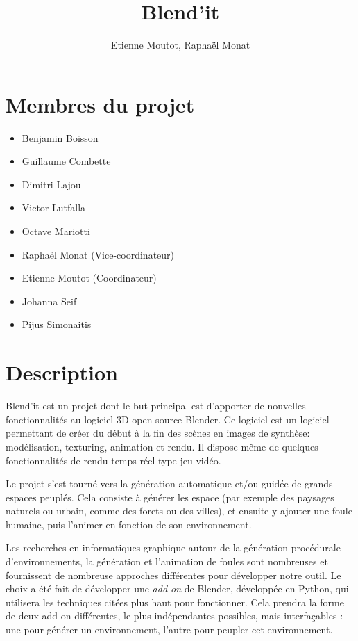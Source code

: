 \documentclass[a4paper,12pt]{article}
\title{Blend'it}
\author{Etienne Moutot, Raphaël Monat}
\begin{document}
\maketitle

\section{Membres du projet}
  \begin{itemize}
    \item Benjamin Boisson
    \item Guillaume Combette
    \item Dimitri Lajou
    \item Victor Lutfalla
    \item Octave Mariotti
    \item Raphaël Monat (Vice-coordinateur)
    \item Etienne Moutot (Coordinateur)
    \item Johanna Seif
    \item Pijus Simonaitis
  \end{itemize}

\section{Description}
Blend'it est un projet dont le but principal est d'apporter de nouvelles fonctionnalités au logiciel 3D open source Blender\cite{Blender}. Ce logiciel est un logiciel permettant de créer du début à la fin des scènes en images de synthèse: modélisation, texturing, animation et rendu. Il dispose même de quelques fonctionnalités de rendu temps-réel type jeu vidéo.

Le projet s'est tourné vers la génération automatique et/ou guidée de grands espaces peuplés. Cela consiste à générer les espace (par exemple des paysages naturels ou urbain, comme des forets ou des villes), et ensuite y ajouter une foule humaine, puis l'animer en fonction de son environnement.

Les recherches en informatiques graphique autour de la génération procédurale d'environnements, la génération et  l'animation de foules sont nombreuses et fournissent de nombreuse approches différentes pour développer notre outil. Le choix a été fait de développer une \textit{add-on} de Blender, développée en Python, qui utilisera les techniques citées plus haut pour fonctionner. Cela prendra la forme de deux add-on différentes, le plus indépendantes possibles, mais interfaçables : une pour générer un environnement, l'autre pour peupler cet environnement.
\end{document}
